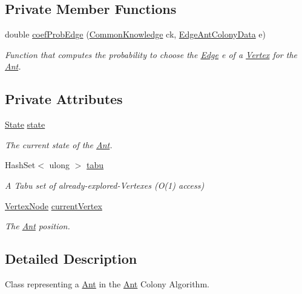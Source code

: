 \subsection*{Private Member Functions}
\begin{DoxyCompactItemize}
\item 
double \hyperlink{classAnt_aac4c3a23f5bceee557f55d1834a918e5}{coef\+Prob\+Edge} (\hyperlink{classCommonKnowledge}{Common\+Knowledge} ck, \hyperlink{classEdgeAntColonyData}{Edge\+Ant\+Colony\+Data} e)
\begin{DoxyCompactList}\small\item\em Function that computes the probability to choose the \hyperlink{classEdge}{Edge} \textquotesingle{}e\textquotesingle{} of a \hyperlink{structVertex}{Vertex} for the \hyperlink{classAnt}{Ant}. \end{DoxyCompactList}\end{DoxyCompactItemize}
\subsection*{Private Attributes}
\begin{DoxyCompactItemize}
\item 
\hyperlink{classAnt_aead9977653848889b0d5e07a50602de6}{State} \hyperlink{classAnt_ad928c0af6e263b134e8f2cb092cfd70e}{state}
\begin{DoxyCompactList}\small\item\em The current state of the \hyperlink{classAnt}{Ant}.\end{DoxyCompactList}\item 
Hash\+Set$<$ ulong $>$ \hyperlink{classAnt_a9415e1d7fd0c6a64bf6bcfc8885fa4ef}{tabu}
\begin{DoxyCompactList}\small\item\em A Tabu set of already-\/explored-\/\+Vertexes (O(1) access)\end{DoxyCompactList}\item 
\hyperlink{classVertexNode}{Vertex\+Node} \hyperlink{classAnt_ad7954946f86084f0a16d70e541403d02}{current\+Vertex}
\begin{DoxyCompactList}\small\item\em The \hyperlink{classAnt}{Ant} position.\end{DoxyCompactList}\end{DoxyCompactItemize}


\subsection{Detailed Description}
Class representing a \hyperlink{classAnt}{Ant} in the \hyperlink{classAnt}{Ant} Colony Algorithm. 



